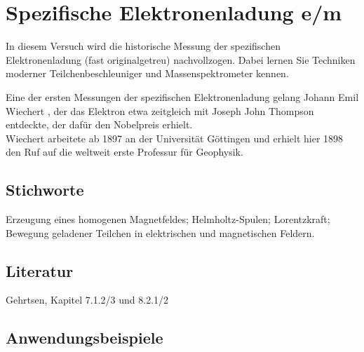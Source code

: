 \chapter{Spezifische Elektronenladung e/m}
\label{v:20}

In diesem Versuch wird die historische Messung der spezifischen Elektronenladung (fast originalgetreu) nachvollzogen. Dabei lernen Sie Techniken moderner Teilchenbeschleuniger und Massenspektrometer kennen.

\begin{hint}
Eine der ersten Messungen der spezifischen Elektronenladung gelang Johann Emil Wiechert , der das Elektron etwa zeitgleich mit Joseph John Thompson entdeckte, der dafür den Nobelpreis erhielt.\\ 
Wiechert arbeitete ab 1897 an der Universität Göttingen und erhielt hier 1898 den Ruf auf die weltweit erste Professur für Geophysik.
\end{hint}

\section{Stichworte}

Erzeugung eines homogenen Magnetfeldes; Helmholtz-Spulen; Lorentzkraft; Bewegung geladener Teilchen in elektrischen und magnetischen Feldern.
%
\section{Literatur}

Gehrtsen, Kapitel 7.1.2/3 und 8.2.1/2
%
\section{Anwendungsbeispiele}

